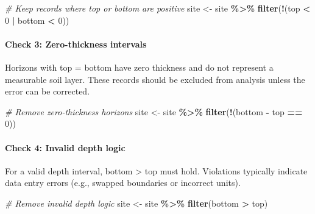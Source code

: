 \documentclass[
  10pt,
  b5paper,
  oneside]{book}
\newenvironment{Shaded}{\begin{snugshade}}{\end{snugshade}}
\newcommand{\CommentTok}[1]{\textcolor[rgb]{0.56,0.35,0.01}{\textit{#1}}}
\newcommand{\DecValTok}[1]{\textcolor[rgb]{0.00,0.00,0.81}{#1}}
\newcommand{\FunctionTok}[1]{\textcolor[rgb]{0.13,0.29,0.53}{\textbf{#1}}}
\newcommand{\NormalTok}[1]{#1}
\newcommand{\OtherTok}[1]{\textcolor[rgb]{0.56,0.35,0.01}{#1}}
\newcommand{\SpecialCharTok}[1]{\textcolor[rgb]{0.81,0.36,0.00}{\textbf{#1}}}
\begin{document}
\begin{Shaded}
\begin{Highlighting}[]
\CommentTok{\# Keep records where \textasciigrave{}top\textasciigrave{} or \textasciigrave{}bottom\textasciigrave{} are positive}
\NormalTok{  site }\OtherTok{\textless{}{-}}\NormalTok{ site }\SpecialCharTok{\%\textgreater{}\%}
    \FunctionTok{filter}\NormalTok{(}\SpecialCharTok{!}\NormalTok{(top }\SpecialCharTok{\textless{}} \DecValTok{0} \SpecialCharTok{|}\NormalTok{ bottom }\SpecialCharTok{\textless{}} \DecValTok{0}\NormalTok{))}
\end{Highlighting}
\end{Shaded}

\paragraph*{Check 3: Zero-thickness intervals}\label{check-3-zero-thickness-intervals}

Horizons with top = bottom have zero thickness and do not represent a measurable soil layer. These records should be excluded from analysis unless the error can be corrected.

\begin{Shaded}
\begin{Highlighting}[]
\CommentTok{\# Remove zero{-}thickness horizons}
\NormalTok{  site }\OtherTok{\textless{}{-}}\NormalTok{ site }\SpecialCharTok{\%\textgreater{}\%}
    \FunctionTok{filter}\NormalTok{(}\SpecialCharTok{!}\NormalTok{(bottom }\SpecialCharTok{{-}}\NormalTok{ top }\SpecialCharTok{==} \DecValTok{0}\NormalTok{))}
\end{Highlighting}
\end{Shaded}

\paragraph*{Check 4: Invalid depth logic}\label{check-4-invalid-depth-logic}

For a valid depth interval, bottom \textgreater{} top must hold. Violations typically indicate data entry errors (e.g., swapped boundaries or incorrect units).

\begin{Shaded}
\begin{Highlighting}[]
\CommentTok{\# Remove invalid depth logic}
\NormalTok{site }\OtherTok{\textless{}{-}}\NormalTok{ site }\SpecialCharTok{\%\textgreater{}\%}
  \FunctionTok{filter}\NormalTok{(bottom }\SpecialCharTok{\textgreater{}}\NormalTok{ top)}
\end{Highlighting}
\end{Shaded}
\end{document}
